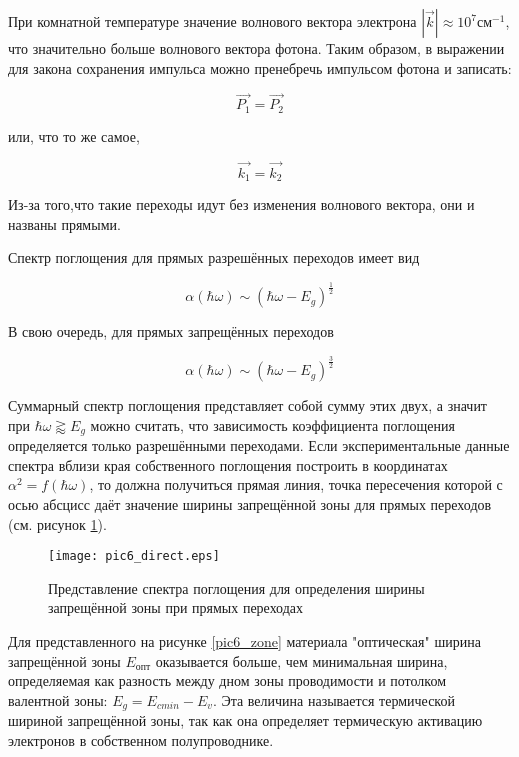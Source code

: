 При комнатной температуре значение волнового вектора электрона $|\overrightarrow{k}| \approx 10^{7} \text{см}^{-1}$, что значительно больше волнового вектора фотона. Таким образом, в выражении для закона сохранения импульса можно пренебречь импульсом фотона и записать:

\begin{equation}
\overrightarrow{P_{1}} = \overrightarrow{P_{2}}
\end{equation}

или, что то же самое,

\begin{equation}
\overrightarrow{k_{1}} = \overrightarrow{k_{2}}
\end{equation}

Из-за того,что такие переходы идут без изменения волнового вектора, они и названы прямыми.

Спектр поглощения для прямых разрешённых переходов имеет вид

\begin{equation}
\alpha(\hbar \omega) \sim (\hbar \omega - E_{g})^{\frac{1}{2}}
\end{equation}

В свою очередь, для прямых запрещённых переходов

\begin{equation}
\alpha(\hbar \omega) \sim (\hbar \omega - E_{g})^{\frac{3}{2}}
\end{equation}

Суммарный спектр поглощения представляет собой сумму этих двух, а значит при $\hbar \omega \gtrapprox E_{g}$ можно считать, что зависимость коэффициента поглощения определяется только разрешёнными переходами. Если экспериментальные данные спектра вблизи края собственного поглощения построить в координатах $\alpha^2 = f(\hbar \omega)$, то должна получиться прямая линия, точка пересечения которой с осью абсцисс даёт значение ширины запрещённой зоны для прямых переходов (см. рисунок \ref{pic6_direct}).

\begin{figure}[h!]\centering
\texttt{[image: pic6\_direct.eps]}
\caption{Представление спектра поглощения для определения ширины запрещённой зоны при прямых переходах}
\label{pic6_direct}
\end{figure}

Для представленного на рисунке \ref{pic6_zone} материала "оптическая" ширина запрещённой зоны $E_{\text{опт}}$ оказывается больше, чем минимальная ширина, определяемая как разность между дном зоны проводимости и потолком валентной зоны: $E_{g} = E_{c min} - E_{v}$. Эта величина называется термической шириной запрещённой зоны, так как она определяет термическую активацию электронов в собственном полупроводнике.

